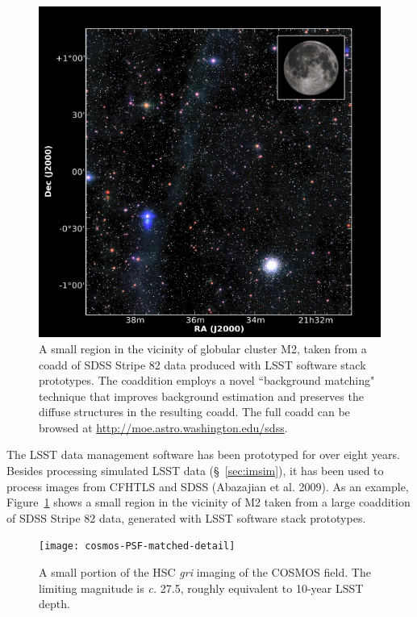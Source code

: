 \begin{figure}
%
%
\includegraphics[width=1.0\hsize,clip]{DMStripe82.jpg}
\caption{
A small region in the vicinity of globular cluster M2, taken from a coadd of SDSS Stripe 82 data produced with LSST software stack prototypes. The coaddition employs a novel ``background matching" technique that improves background estimation and preserves the diffuse structures in the resulting coadd. The full coadd can be browsed at \url{http://moe.astro.washington.edu/sdss}.}
\label{Fig:DMStripe82}
\end{figure}


The LSST data management software has been prototyped for over eight
years. Besides processing simulated LSST data
(\S~\ref{sec:imsim}), it has been used to process images from CFHTLS
and SDSS (Abazajian et al. 2009). As an example,
Figure~\ref{Fig:DMStripe82} shows a small region in the vicinity of M2
taken from a large coaddition of SDSS Stripe 82 data, generated with LSST
software stack prototypes.

\begin{figure}
\texttt{[image: cosmos-PSF-matched-detail]}
\caption{
  A small portion of the HSC \textit{gri} imaging of the COSMOS field.  The limiting magnitude is
  \textit{c.} 27.5, roughly equivalent to 10-year LSST depth.
  }
\label{Fig:HSC_cosmos}
\end{figure}

